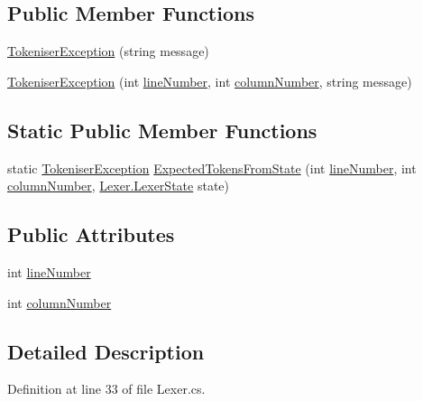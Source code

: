 \subsection*{Public Member Functions}
\begin{DoxyCompactItemize}
\item 
\hyperlink{a00168_ad00fcf742d2b0d476ce43b27a3f3b6c1}{Tokeniser\-Exception} (string message)
\item 
\hyperlink{a00168_aa8674d006a0d29081a7b87bdd8ff2f4f}{Tokeniser\-Exception} (int \hyperlink{a00168_a54b936d7b4f26f88a07a66c5fc1d1ad1}{line\-Number}, int \hyperlink{a00168_aabf2ad38f3984297c1daede9be55e3d6}{column\-Number}, string message)
\end{DoxyCompactItemize}
\subsection*{Static Public Member Functions}
\begin{DoxyCompactItemize}
\item 
static \hyperlink{a00168}{Tokeniser\-Exception} \hyperlink{a00168_af88cfa5eafdee355e1abb67e358497bd}{Expected\-Tokens\-From\-State} (int \hyperlink{a00168_a54b936d7b4f26f88a07a66c5fc1d1ad1}{line\-Number}, int \hyperlink{a00168_aabf2ad38f3984297c1daede9be55e3d6}{column\-Number}, \hyperlink{a00122}{Lexer.\-Lexer\-State} state)
\end{DoxyCompactItemize}
\subsection*{Public Attributes}
\begin{DoxyCompactItemize}
\item 
int \hyperlink{a00168_a54b936d7b4f26f88a07a66c5fc1d1ad1}{line\-Number}
\item 
int \hyperlink{a00168_aabf2ad38f3984297c1daede9be55e3d6}{column\-Number}
\end{DoxyCompactItemize}


\subsection{Detailed Description}


Definition at line 33 of file Lexer.\-cs.



